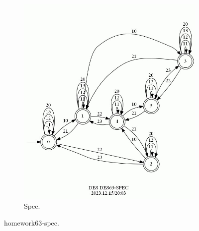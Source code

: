 \documentclass{article}
\begin{document}
\begin{figure}[h!]
\begin{subfigure}{0.5\linewidth}
    \includegraphics[width=\linewidth]{assets/DES63-SPEC.jpg}
    \caption{Spec.}
  \end{subfigure}
  \caption{homework63-spec.}
  \label{fig:des63-spec}
\end{figure}
\end{document}
